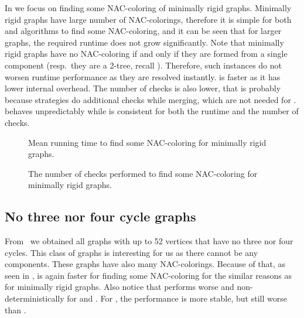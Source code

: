 In 
we focus on finding some NAC-coloring of minimally rigid graphs.
%
Minimally rigid graphs have large number of NAC-colorings,
therefore it is simple for both \NaiveCycles{}
and \Subgraphs{} algorithms to find some NAC-coloring,
and it can be seen that for larger graphs, the required runtime
does not grow significantly.
%
Note that minimally rigid graphs have no NAC-coloring if and only if they are formed from
a single \trcon{} component (resp.\ they are a 2-tree, recall ).
Therefore, such instances do not worsen runtime performance as they are resolved instantly.
%
\NaiveCycles{} is faster as it has lower internal overhead.
The number of \IsNACColoring{} checks is also lower,
that is probably because \Subgraphs{} strategies do additional checks
while merging, which are not needed for \NaiveCycles{}.
\SharedVertices{} behaves unpredictably while \MergeLinear{} is consistent
for both the runtime and the number of \IsNACColoring{} checks.

\begin{figure}[thbp]
	\centering
	\scalebox{\BenchFigureScale}{}
	\caption[Mean runtime for minimally rigid graphs (some)]{
		Mean running time to find some NAC-coloring for minimally rigid graphs.}%
	\label{fig:graph_minimally_rigid_first_runtime}
\end{figure}%
\begin{figure}[thbp]
	\centering
	\scalebox{\BenchFigureScale}{}
	\caption[Checks performed for minimally rigid graphs (some)]{
		The number of checks performed to find some NAC-coloring for minimally rigid graphs.}%
	\label{fig:graph_minimally_rigid_first_checks}
\end{figure}%



\subsection*{No three nor four cycle graphs}

From~\cite{extremal_graphs} we obtained all graphs with up to 52 vertices
that have no three nor four cycles. This class of graphs is interesting for us
as there cannot be any \trcon{} components.
These graphs have also many NAC-colorings.
Because of that, as seen in ,
\NaiveCycles{} is again faster for finding some NAC-coloring
for the similar reasons as for minimally rigid graphs.
%
Also notice that \SharedVertices{} performs worse and non-deterministically
for \CyclesMatchChunks{} and \None{}.
For \Neighbors{}, the performance is more stable, but still worse than \MergeLinear{}.

